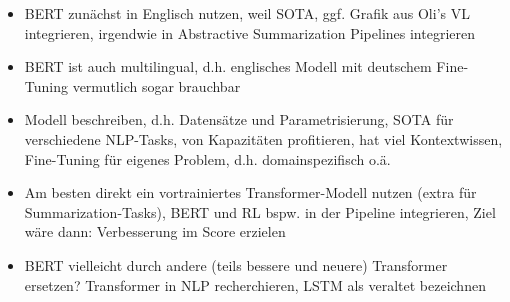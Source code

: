 \begin{itemize}
	\item BERT zunächst in Englisch nutzen, weil SOTA, ggf. Grafik aus Oli's VL integrieren, irgendwie in Abstractive Summarization Pipelines integrieren
	\item BERT ist auch multilingual, d.h. englisches Modell mit deutschem Fine-Tuning vermutlich sogar brauchbar
	\item Modell beschreiben, d.h. Datensätze und Parametrisierung, SOTA für verschiedene NLP-Tasks, von Kapazitäten profitieren, hat viel Kontextwissen, Fine-Tuning für eigenes Problem, d.h. domainspezifisch o.ä.
	\item Am besten direkt ein vortrainiertes Transformer-Modell nutzen (extra für Summarization-Tasks), BERT und RL bspw. in der Pipeline integrieren, Ziel wäre dann: Verbesserung im Score erzielen
	\item BERT vielleicht durch andere (teils bessere und neuere) Transformer ersetzen? Transformer in NLP recherchieren, LSTM als veraltet bezeichnen
\end{itemize}
